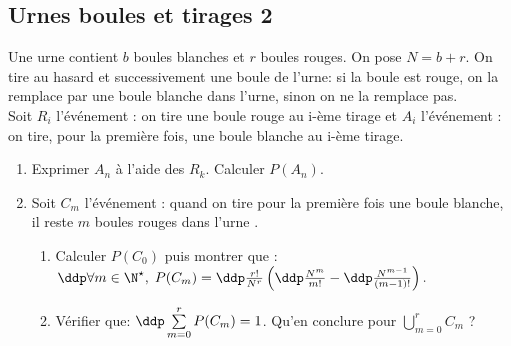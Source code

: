 \subsection{Urnes boules et tirages 2 }

\begin{exercice}   \;
Une urne contient $b$ boules blanches et $r$ boules rouges. On pose $N=b+r$. On tire au hasard et successivement une boule de l'urne: si la boule est rouge, on la remplace par une boule blanche dans l'urne, sinon on ne la remplace pas.\\
\noindent Soit $R_i$ l'\'ev\'enement : \og on tire une boule rouge au i-\`eme tirage\fg \;  et $A_i$ l'\'ev\'enement : \og on tire, pour la premi\`ere fois, une boule blanche au i-\`eme tirage\fg.
\begin{enumerate}
 \item Exprimer $A_n$ \`a l'aide des $R_k$. Calculer $P(A_n)$.
\item Soit $C_m$ l'\'ev\'enement : \og quand on tire pour la premi\`ere fois une boule blanche, il reste $m$ boules rouges dans l'urne \fg.
\begin{enumerate}
\item Calculer $P(C_0)$ puis montrer que : $\ddp \forall m\in\N^{\star},\; P(C_m)=\ddp\frac{r!}{N^r}\left( \ddp\frac{N^m}{m!}-\ddp\frac{N^{m-1}}{(m-1)!} \right).$
\item V\'erifier que: $\ddp \sum\limits_{m=0}^r P(C_m)=1$. Qu'en conclure pour $\bigcup\limits_{m=0}^r C_m$ ?
\end{enumerate}
\end{enumerate}
\end{exercice}


